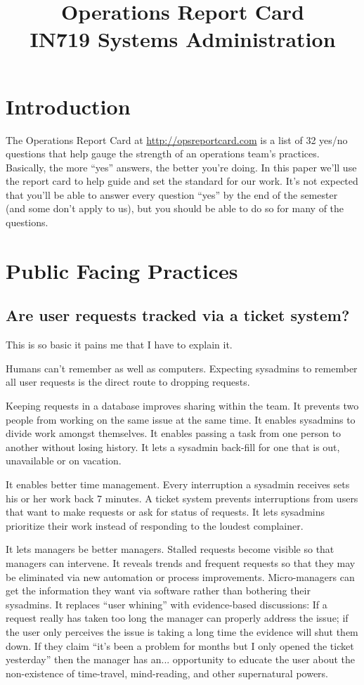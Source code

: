 \documentclass{article}
\begin{document}
\title{Operations Report Card \\ IN719 Systems Administration}
\date{}
\maketitle

\section*{Introduction}
The Operations Report Card at \url{http://opsreportcard.com} is a list of 32 yes/no questions that help gauge the strength of an operations team's practices. Basically, the more ``yes'' answers, the better you're doing. In this paper we'll use the report card to help guide and set the standard for our work. It’s not expected that you'll be able to answer every question ``yes'' by the end of the semester (and some don't apply to us), but you should be able to do so for many of the questions.

\section{Public Facing Practices}

\subsection{Are user requests tracked via a ticket system?}
This is so basic it pains me that I have to explain it.

Humans can't remember as well as computers. Expecting sysadmins to remember all user requests is the direct route to dropping requests.

Keeping requests in a database improves sharing within the team. It prevents two people from working on the same issue at the same time. It enables sysadmins to divide work amongst themselves. It enables passing a task from one person to another without losing history. It lets a sysadmin back-fill for one that is out, unavailable or on vacation.

It enables better time management. Every interruption a sysadmin receives sets his or her work back 7 minutes. A ticket system prevents interruptions from users that want to make requests or ask for status of requests. It lets sysadmins prioritize their work instead of responding to the loudest complainer.

It lets managers be better managers. Stalled requests become visible so that managers can intervene. It reveals trends and frequent requests so that they may be eliminated via new automation or process improvements. Micro-managers can get the information they want via software rather than bothering their sysadmins. It replaces ``user whining'' with evidence-based discussions: If a request really has taken too long the manager can properly address the issue; if the user only perceives the issue is taking a long time the evidence will shut them down. If they claim ``it's been a problem for months but I only opened the ticket yesterday'' then the manager has an... opportunity to educate the user about the non-existence of time-travel, mind-reading, and other supernatural powers.
\end{document}

